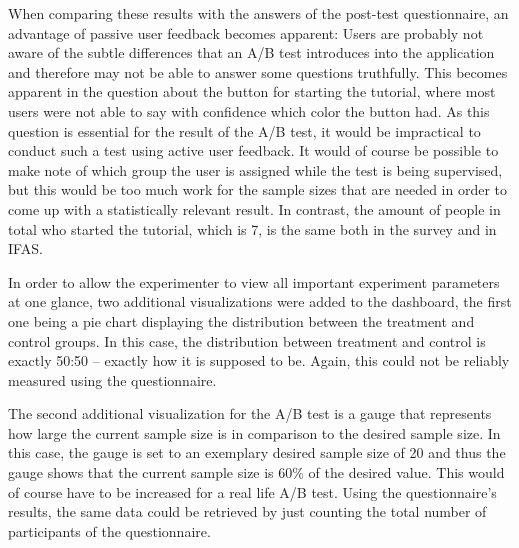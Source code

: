 When comparing these results with the answers of the post-test questionnaire, an advantage of passive user feedback becomes apparent:
Users are probably not aware of the subtle differences that an A/B test introduces into the application and therefore may not be able to answer some questions truthfully.
This becomes apparent in the question about the button for starting the tutorial, where most users were not able to say with confidence which color the button had.
As this question is essential for the result of the A/B test, it would be impractical to conduct such a test using active user feedback.
It would of course be possible to make note of which group the user is assigned while the test is being supervised, but this would be too much work for the sample sizes that are needed in order to come up with a statistically relevant result.
In contrast, the amount of people in total who started the tutorial, which is 7, is the same both in the survey and in \ac{IFAS}.

In order to allow the experimenter to view all important experiment parameters at one glance, two additional visualizations were added to the dashboard, the first one being a pie chart displaying the distribution between the treatment and control groups.
In this case, the distribution between treatment and control is exactly 50:50 -- exactly how it is supposed to be.
Again, this could not be reliably measured using the questionnaire.

The second additional visualization for the A/B test is a gauge that represents how large the current sample size is in comparison to the desired sample size.
In this case, the gauge is set to an exemplary desired sample size of 20 and thus the gauge shows that the current sample size is 60\% of the desired value.
This would of course have to be increased for a real life A/B test.
Using the questionnaire's results, the same data could be retrieved by just counting the total number of participants of the questionnaire.


%
%
%
%

